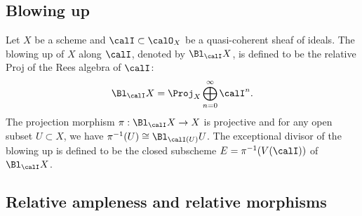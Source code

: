 \subsection{Blowing up}

    \begin{definition}\label{def:blowing_up}
        Let \(X\) be a scheme and \(\calI \subset \calO_X\) be a quasi-coherent sheaf of ideals.
        The blowing up of \(X\) along \(\calI\), denoted by \(\Bl_\calI X\), is defined to be the relative Proj of the Rees algebra of \(\calI\):
        \[
            \Bl_\calI X = \Proj_X \bigoplus_{n=0}^\infty \calI^n.
        \]
        The projection morphism \(\pi : \Bl_\calI X \to X\) is projective and for any open subset \(U \subset X\), we have \(\pi^{-1}(U) \cong \Bl_{\calI(U)} U\).
        The exceptional divisor of the blowing up is defined to be the closed subscheme \(E = \pi^{-1}(V(\calI))\) of \(\Bl_\calI X\).
    \end{definition}

\subsection{Relative ampleness and relative morphisms}


